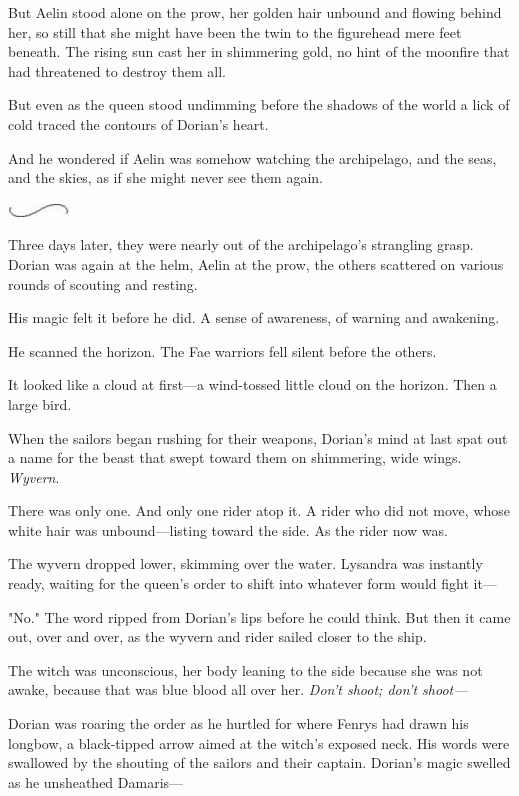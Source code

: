 But Aelin stood alone on the prow, her golden hair unbound and flowing behind her, so still that she might have been the twin to the figurehead mere feet beneath.
The rising sun cast her in shimmering gold, no hint of the moonfire that had threatened to destroy them all.

But even as the queen stood undimming before the shadows of the world  a lick of cold traced the contours of Dorian's heart.

And he wondered if Aelin was somehow watching the archipelago, and the seas, and the skies, as if she might never see them again.

\begin{center}
	\includegraphics[width=0.65in,height=0.13in]{images/seperator}
\end{center}

Three days later, they were nearly out of the archipelago's strangling grasp.
Dorian was again at the helm, Aelin at the prow, the others scattered on various rounds of scouting and resting.

His magic felt it before he did.
A sense of awareness, of warning and awakening.

He scanned the horizon.
The Fae warriors fell silent before the others.

It looked like a cloud at first---a wind-tossed little cloud on the horizon.
Then a large bird.

When the sailors began rushing for their weapons, Dorian's mind at last spat out a name for the beast that swept toward them on shimmering, wide wings.
\emph{Wyvern}.

There was only one.
And only one rider atop it.
A rider who did not move, whose white hair was unbound---listing toward the side.
As the rider now was.

The wyvern dropped lower, skimming over the water.
Lysandra was instantly ready, waiting for the queen's order to shift into whatever form would fight it---

"No."
The word ripped from Dorian's lips before he could think.
But then it came out, over and over, as the wyvern and rider sailed closer to the ship.

The witch was unconscious, her body leaning to the side because she was not awake, because that was blue blood all over her.
\emph{Don't shoot;
don't shoot---}

Dorian was roaring the order as he hurtled for where Fenrys had drawn his longbow, a black-tipped arrow aimed at the witch's exposed neck.
His words were swallowed by the shouting of the sailors and their captain.
Dorian's magic swelled as he unsheathed Damaris---

